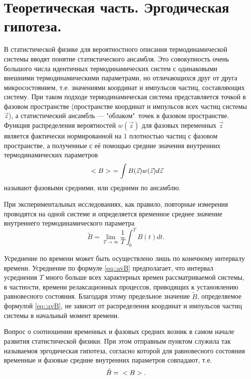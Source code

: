 \documentclass[12pt,a4paper]{scrartcl}
\begin{document}
\section{Теоретическая часть. Эргодическая гипотеза.}
	
    В статистической физике для вероятностного описания термодинамической системы вводят понятие статистического ансамбля. Это совокупность очень большого числа идентичных термодинамических систем с одинаковыми внешними термодинамическими параметрами, но отличающихся друг от друга микросостоянием, т.е. значениями координат и импульсов частиц, составляющих систему. При таком подходе термодинамическая система представляется точкой в фазовом пространстве (пространстве координат и импульсов всех частиц системы $\vec{z}$), а статистический ансамбль --- "облаком"\ точек в фазовом пространстве. Функция распределения вероятностей $w(\vec{z})$ для фазовых переменных $\vec{z}$ является фактически нормированной на $1$ плотностью частиц с фазовом пространстве, а полученные с её помощью средние значения внутренних термодинамических параметров
    \begin{equation}
    \label{eq::vecB}
    \\<B \\>\ = \int{B(\vec{z})w(\vec{z})d\vec{z}}
    \end{equation}
называют фазовыми средними, или средними по ансамблю.

	При экспериментальных исследованиях, как правило, повторные измерения проводятся на одной системе и определяется временное среднее значение внутреннего термодинамического параметра
	\begin{equation}
    \label{eq::avB}
    \tilde{B} = \lim_{T \to \infty} \frac{1}{T} \int_{0}^{T} B(t)dt.
	\end{equation}
	
	Усреднение по времени может быть осуществлено лишь по конечному интервалу времени. Усреднение по формуле \eqref{eq::avB} предполагает, что интервал усреднения $T$ много больше всех характерных времен рассматриваемой системы, в частности, времени релаксационных процессов, приводящих к установлению равновесного состояния. Благодаря этому предельное значение $\tilde{B}$, определяемое формулой \eqref{eq::avB}, не зависит от распределения координат и импульсов частиц системы в начальный момент времени.
	
	Вопрос о соотношении временных и фазовых средних возник в самом начале развития статистической физики. При этом отправным пунктом служила так называемоя эргодическая гипотеза, согласно которой для равновесного состояния временные и фазовые средние внутренних параметров совпадают, т.е.
	\begin{equation}
	\label{eq::veceqav}
	\tilde{B} = \\<B \\>.
	\end{equation}
	
\end{document}
